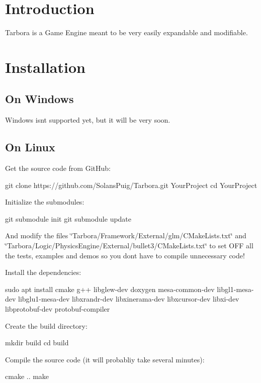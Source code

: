 \hypertarget{index_intro_sec}{}\section{Introduction}\label{index_intro_sec}
Tarbora is a Game Engine meant to be very easily expandable and modifiable. \hypertarget{index_install_sec}{}\section{Installation}\label{index_install_sec}
\hypertarget{index_windows}{}\subsection{On Windows}\label{index_windows}
Windows isn\textquotesingle{}t supported yet, but it will be very soon. \hypertarget{index_linux}{}\subsection{On Linux}\label{index_linux}
Get the source code from Git\+Hub\+: 
\begin{DoxyCode}
git clone https://github.com/SolansPuig/Tarbora.git YourProject
cd YourProject
\end{DoxyCode}


Initialize the submodules\+: 
\begin{DoxyCode}
git submodule init
git submodule update
\end{DoxyCode}
 And modify the files \char`\"{}\+Tarbora/\+Framework/\+External/glm/\+C\+Make\+Lists.\+txt\char`\"{} and \char`\"{}\+Tarbora/\+Logic/\+Physics\+Engine/\+External/bullet3/\+C\+Make\+Lists.\+txt\char`\"{} to set O\+FF all the tests, examples and demos so you don\textquotesingle{}t have to compile unnecessary code!

Install the dependencies\+: 
\begin{DoxyCode}
sudo apt install cmake g++ libglew-dev doxygen mesa-common-dev libgl1-mesa-dev libglu1-mesa-dev
       libxrandr-dev libxinerama-dev libxcursor-dev libxi-dev libprotobuf-dev protobuf-compiler
\end{DoxyCode}


Create the build directory\+: 
\begin{DoxyCode}
mkdir build
cd build
\end{DoxyCode}


Compile the source code (it will probabliy take several minutes)\+: 
\begin{DoxyCode}
cmake ..
make
\end{DoxyCode}


